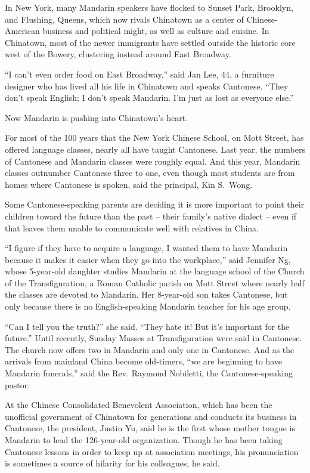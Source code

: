 ﻿\documentclass[12pt]{article}
\begin{document}
In New York, many Mandarin speakers have flocked to Sunset Park, Brooklyn, and Flushing, Queens,
which now rivals Chinatown as a center of Chinese-American business and political might, as well as
culture and cuisine\cite{cuisine}. In Chinatown, most of the newer immigrants have settled outside
the historic core west of the Bowery, clustering instead around East Broadway.

``I can't even order food on East Broadway,'' said Jan Lee, 44, a furniture designer who has lived
all his life in Chinatown and speaks Cantonese. ``They don't speak English; I don't speak Mandarin.
I'm just as lost as everyone else.''

Now Mandarin is pushing into Chinatown's heart.

For most of the 100 years that the New York Chinese School, on Mott Street, has offered language
classes, nearly all have taught Cantonese. Last year, the numbers of Cantonese and Mandarin classes
were roughly equal. And this year, Mandarin classes outnumber Cantonese three to one, even though
most students are from homes where Cantonese is spoken, said the principal, Kin S.~Wong.

Some Cantonese-speaking parents are deciding it is more important to point their children toward the
future than the past -- their family's native dialect -- even if that leaves them unable to
communicate well with relatives in China.

``I figure if they have to acquire a language, I wanted them to have Mandarin because it makes it
easier when they go into the workplace,'' said Jennifer Ng, whose 5-year-old daughter studies
Mandarin at the language school of the Church of the Transfiguration, a Roman Catholic parish on
Mott Street where nearly half the classes are devoted to Mandarin. Her 8-year-old son takes
Cantonese, but only because there is no English-speaking Mandarin teacher for his age group.

``Can I tell you the truth?'' she said. ``They hate it! But it's important for the future.'' Until
recently, Sunday Masses at Transfiguration were said in Cantonese. The church now offers two in
Mandarin and only one in Cantonese. And as the arrivals from mainland China become old-timers, ``we
are beginning to have Mandarin funerals,'' said the Rev. Raymond Nobiletti, the Cantonese-speaking
pastor.

At the Chinese Consolidated Benevolent Association, which has been the unofficial government of
Chinatown for generations and conducts its business in Cantonese, the president, Justin Yu, said he
is the first whose mother tongue is Mandarin to lead the 126-year-old organization. Though he has
been taking Cantonese lessons in order to keep up at association meetings, his pronunciation is
sometimes a source of hilarity\cite{hilarity} for his colleagues, he said.
\end{document}
